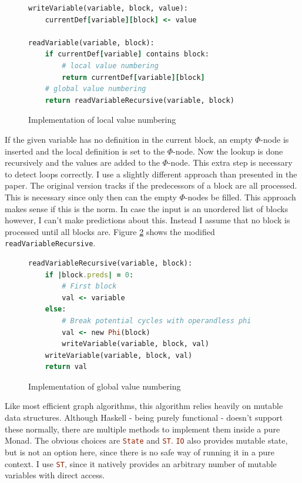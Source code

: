 \documentclass[a4paper,bibliography=totocnumbered,parskip,headsepline]{scrbook}
\begin{document}
\begin{figure}
\begin{lstlisting}[language=ruby]
writeVariable(variable, block, value):
    currentDef[variable][block] <- value

readVariable(variable, block):
    if currentDef[variable] contains block:
        # local value numbering
        return currentDef[variable][block]
    # global value numbering
    return readVariableRecursive(variable, block)
\end{lstlisting}
\caption{Implementation of local value numbering}
\label{fig:localnum}
\end{figure}

If the given variable has no definition in the current block, an empty $\Phi$-node is inserted and the local definition is set to the $\Phi$-node.
Now the lookup is done recursively and the values are added to the $\Phi$-node.
This extra step is necessary to detect loops correctly.
I use a slightly different approach than presented in the paper.
The original version tracks if the predecessors of a block are all processed.
This is necessary since only then can the empty $\Phi$-nodes be filled.
This approach makes sense if this is the norm.
In case the input is an unordered list of blocks however, I can't make predictions about this.
Instead I assume that no block is processed until all blocks are.
Figure \ref{fig:globalnum} shows the modified \lstinline[language=haskell]!readVariableRecursive!.

\begin{figure}
\begin{lstlisting}[language=ruby]
readVariableRecursive(variable, block):
    if |block.preds| = 0:
        # First block
        val <- variable
    else:
        # Break potential cycles with operandless phi
        val <- new Phi(block)
        writeVariable(variable, block, val)
    writeVariable(variable, block, val)
    return val
\end{lstlisting}
\caption{Implementation of global value numbering}
\label{fig:globalnum}
\end{figure}

Like most efficient graph algorithms, this algorithm relies heavily on mutable data structures.
Although Haskell - being purely functional - doesn't support these normally, there are multiple methods to implement them inside a pure Monad.
The obvious choices are \lstinline[language=haskell]!State! and \lstinline[language=haskell]!ST!.
\lstinline[language=haskell]!IO! also provides mutable state, but is not an option here, since there is no safe way of running it in a pure context.
I use \lstinline[language=haskell]!ST!, since it natively provides an arbitrary number of mutable variables with direct access.
\end{document}
